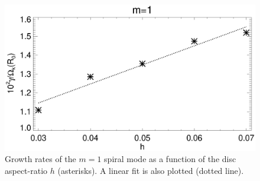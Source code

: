 \begin{figure}
  \includegraphics[width=\linewidth]{figures/m1_analysis_plot_ratemax_fargo_varh}    
  \caption{Growth rates of the $m=1$ spiral mode as a function of the
    disc aspect-ratio $h$ (asterisks). A linear fit is also
    plotted (dotted line). 
    \label{fargo_varh_growth}} 
\end{figure}

